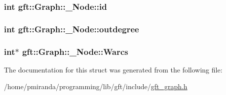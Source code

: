 \subsubsection[{\texorpdfstring{id}{id}}]{\setlength{\rightskip}{0pt plus 5cm}int gft\+::\+Graph\+::\+\_\+\+Node\+::id}\hypertarget{structgft_1_1Graph_1_1__Node_a814e66dd62a8bc908600b275762f095a}{}\label{structgft_1_1Graph_1_1__Node_a814e66dd62a8bc908600b275762f095a}
\subsubsection[{\texorpdfstring{outdegree}{outdegree}}]{\setlength{\rightskip}{0pt plus 5cm}int gft\+::\+Graph\+::\+\_\+\+Node\+::outdegree}\hypertarget{structgft_1_1Graph_1_1__Node_ace8a528045d81543c6fe13a62d0bfb0d}{}\label{structgft_1_1Graph_1_1__Node_ace8a528045d81543c6fe13a62d0bfb0d}
\subsubsection[{\texorpdfstring{Warcs}{Warcs}}]{\setlength{\rightskip}{0pt plus 5cm}int$\ast$ gft\+::\+Graph\+::\+\_\+\+Node\+::\+Warcs}\hypertarget{structgft_1_1Graph_1_1__Node_aa214fccc7e7d1f5d08f9c05f8b1ead6c}{}\label{structgft_1_1Graph_1_1__Node_aa214fccc7e7d1f5d08f9c05f8b1ead6c}


The documentation for this struct was generated from the following file\+:\begin{DoxyCompactItemize}
\item 
/home/pmiranda/programming/lib/gft/include/\hyperlink{gft__graph_8h}{gft\+\_\+graph.\+h}\end{DoxyCompactItemize}
